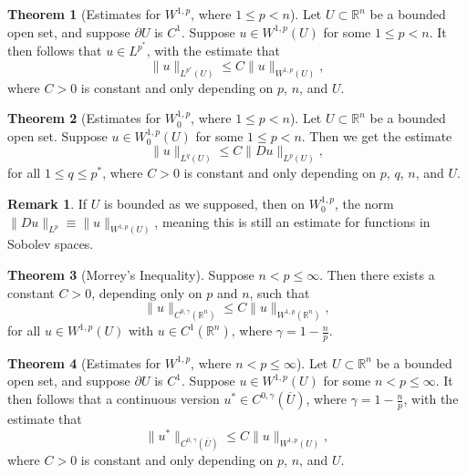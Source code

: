 \documentclass[11pt]{article}
\theoremstyle{definition}
\newtheorem*{theorem}{Theorem}
\newtheorem*{remark}{Remark}
\begin{document}
\begin{theorem}[Estimates for $W^{1,p}$, where $1 \leq p < n$]
Let $U \subset \mathbb{R}^n$ be a bounded open set, and suppose $\partial U$ is $C^1$.
Suppose $u \in W^{1,p}(U)$ for some $1 \leq p < n$. It then follows that $u \in L^{p^*}$, with the estimate that
	\[\|u\|_{L^{p^*}(U)} \leq C\|u\|_{W^{1,p}(U)},\]
where $C > 0$ is constant and only depending on $p$, $n$, and $U$.
\end{theorem}

\begin{theorem}[Estimates for $W_{0}^{1,p}$, where $1 \leq p < n$]
Let $U \subset \mathbb{R}^n$ be a bounded open set.
	Suppose $u \in W_{0}^{1,p}(U)$ for some $1 \leq p < n$. Then we get the estimate
	\[\|u\|_{L^{q}(U)} \leq C\|Du\|_{L^{p}(U)},\]
for all $1 \leq q \leq p^*$, where $C > 0$ is constant and only depending on $p$, $q$, $n$, and $U$.
\end{theorem}
\begin{remark}
If $U$ is bounded as we supposed, then on $W_{0}^{1,p}$, the norm $\|Du\|_{L^{p}} \equiv \|u\|_{W^{1,p}(U)}$,
meaning this is still an estimate for functions in Sobolev spaces.
\end{remark}

\begin{theorem}[Morrey's Inequality]
Suppose $n < p \leq \infty$. Then there exists a constant $C > 0$, depending only on $p$ and $n$, such that
	\[\|u\|_{C^{0,\gamma}(\mathbb{R}^n)} \leq C\|u\|_{W^{1,p}(\mathbb{R}^n)},\]
for all $u \in W^{1,p}(U)$ with $u \in C^1(\mathbb{R}^n)$, where $\gamma = 1 - \frac{n}{p}$.
\end{theorem}

\begin{theorem}[Estimates for $W^{1,p}$, where $n < p \leq \infty$]
Let $U \subset \mathbb{R}^n$ be a bounded open set, and suppose $\partial U$ is $C^1$.
	Suppose $u \in W^{1,p}(U)$ for some $n < p \leq \infty$. It then follows that a continuous version $u^* \in C^{0,\gamma}(\overline{U})$,
where $\gamma = 1 - \frac{n}{p}$, with the estimate that
	\[\|u^*\|_{C^{0,\gamma}(\overline{U})} \leq C\|u\|_{W^{1,p}(U)},\]
where $C > 0$ is constant and only depending on $p$, $n$, and $U$.
\end{theorem}

\newpage
\end{document}
